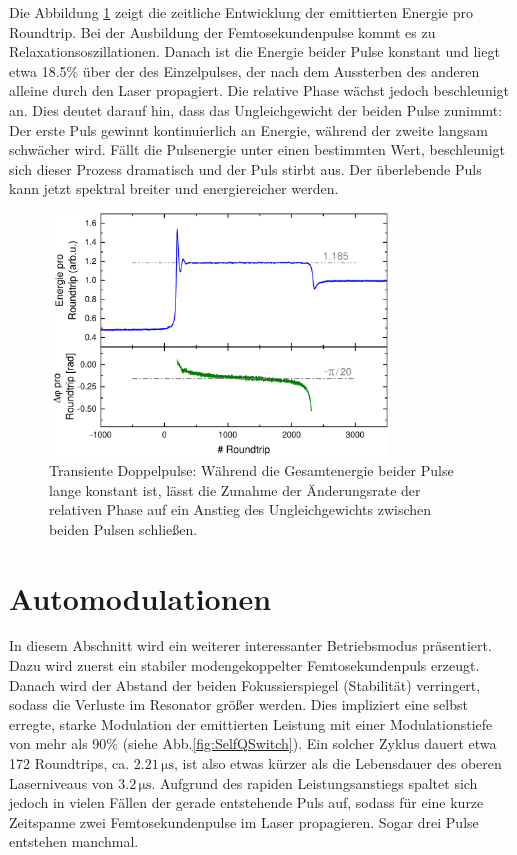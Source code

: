 \documentclass[bachelor,       %
               twoside,        %
               BCOR10mm,       %
               liststotoc,nomtotoc,bibtotoc, %
               english,ngerman, %
               final,          %
               ]{GAUBM}
\begin{document}
Die Abbildung \ref{fig:TransientSplittingAusw} zeigt die zeitliche Entwicklung der emittierten Energie pro Roundtrip.
Bei der Ausbildung der Femtosekundenpulse kommt es zu Relaxationsoszillationen.
Danach ist die Energie beider Pulse konstant und liegt etwa 18.5\% über der des Einzelpulses, der nach dem Aussterben des anderen alleine durch den Laser propagiert.
Die relative Phase wächst jedoch beschleunigt an.
Dies deutet darauf hin, dass das Ungleichgewicht der beiden Pulse zunimmt: Der erste Puls gewinnt kontinuierlich an Energie, während der zweite langsam schwächer wird.
Fällt die Pulsenergie unter einen bestimmten Wert, beschleunigt sich dieser Prozess dramatisch und der Puls stirbt aus.
Der überlebende Puls kann jetzt spektral breiter und energiereicher werden.
\begin{figure}[!htb]
	\centering
	\includegraphics[width=0.8\textwidth]{figures/TransientSplittingAusw}
	\caption{Transiente Doppelpulse: Während die Gesamtenergie beider Pulse lange konstant ist, lässt die Zunahme der Änderungsrate der relativen Phase auf ein Anstieg des Ungleichgewichts zwischen beiden Pulsen schließen.}
	\label{fig:TransientSplittingAusw}
\end{figure}

\clearpage
\section{Automodulationen}
In diesem Abschnitt wird ein weiterer interessanter Betriebsmodus präsentiert.
Dazu wird zuerst ein stabiler modengekoppelter Femtosekundenpuls erzeugt.
Danach wird der Abstand der beiden Fokussierspiegel (Stabilität) verringert, sodass die Verluste im Resonator größer werden.
Dies impliziert eine selbst erregte, starke Modulation der emittierten Leistung mit einer Modulationstiefe von mehr als 90\% (siehe Abb.\ref{fig:SelfQSwitch}).
Ein solcher Zyklus dauert etwa 172 Roundtrips, ca. $2.21\,\si{\micro\second}$, ist also etwas kürzer als die Lebensdauer des oberen Laserniveaus von $3.2\,\si{\micro\second}$.
Aufgrund des rapiden Leistungsanstiegs spaltet sich jedoch in vielen Fällen der gerade entstehende Puls auf, sodass für eine kurze Zeitspanne zwei Femtosekundenpulse im Laser propagieren.
Sogar drei Pulse entstehen manchmal.
\end{document}

